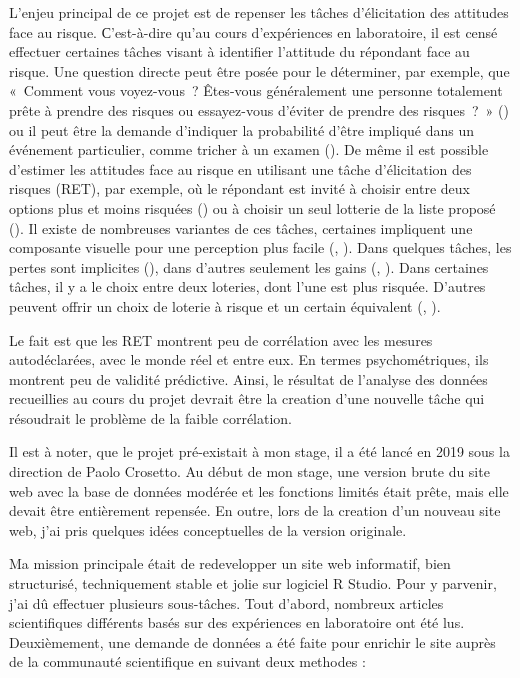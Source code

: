 \documentclass[12pt]{article}
\begin{document}
L'enjeu principal de ce projet est de repenser les tâches d'élicitation
des attitudes face au risque. С'est-à-dire qu'au cours d'expériences en
laboratoire, il est censé effectuer certaines tâches visant à identifier
l'attitude du répondant face au risque. Une question directe peut être
posée pour le déterminer, par exemple, que «~Comment vous voyez-vous~?
Êtes-vous généralement une personne totalement prête à prendre des
risques ou essayez-vous d'éviter de prendre des risques~?~»
(\citet{SOEP2007}) ou il peut être la demande d'indiquer la probabilité
d'être impliqué dans un événement particulier, comme tricher à un examen
(\citet{Blais2006}). De même il est possible d'estimer les attitudes
face au risque en utilisant une tâche d'élicitation des risques (RET),
par exemple, où le répondant est invité à choisir entre deux options
plus et moins risquées (\citet{Holt2002}) ou à choisir un seul lotterie
de la liste proposé (\citet{Eckel2002}). Il existe de nombreuses
variantes de ces tâches, certaines impliquent une composante visuelle
pour une perception plus facile (\citet{Hunt2005},
\citet{Crosetto2013}). Dans quelques tâches, les pertes sont implicites
(\citet{Menkhoff_Sakha_2017}), dans d'autres seulement les gains
(\citet{Eckel2002}, \citet{Holt2002}). Dans certaines tâches, il y a le
choix entre deux loteries, dont l'une est plus risquée. D'autres peuvent
offrir un choix de loterie à risque et un certain équivalent
(\citet{Menkhoff_Sakha_2017}, \citet{Csermely2014}).

Le fait est que les RET montrent peu de corrélation avec les mesures
autodéclarées, avec le monde réel et entre eux. En termes
psychométriques, ils montrent peu de validité prédictive. Ainsi, le
résultat de l'analyse des données recueillies au cours du projet devrait
être la creation d'une nouvelle tâche qui résoudrait le problème de la
faible corrélation.

Il est à noter, que le projet pré-existait à mon stage, il a été lancé
en 2019 sous la direction de Paolo Crosetto. Au début de mon stage, une
version brute du site web avec la base de données modérée et les
fonctions limités était prête, mais elle devait être entièrement
repensée. En outre, lors de la creation d'un nouveau site web, j'ai pris
quelques idées conceptuelles de la version originale.

Ma mission principale était de redevelopper un site web informatif, bien
structurisé, techniquement stable et jolie sur logiciel R Studio. Pour y
parvenir, j'ai dû effectuer plusieurs sous-tâches. Tout d'abord,
nombreux articles scientifiques différents basés sur des expériences en
laboratoire ont été lus. Deuxièmement, une demande de données a été
faite pour enrichir le site auprès de la communauté scientifique en
suivant deux methodes :
\end{document}

